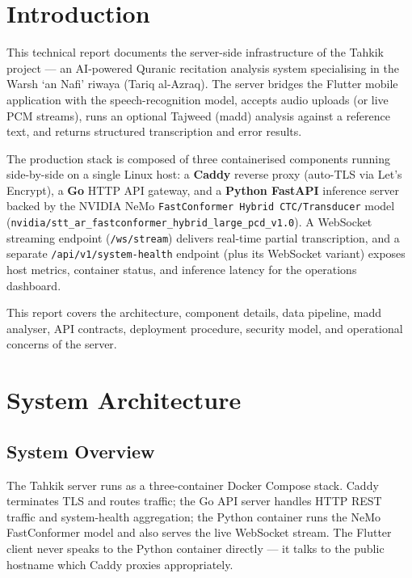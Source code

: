 \chapter{Introduction}

This technical report documents the server-side infrastructure of the Tahkik project --- an AI-powered Quranic recitation analysis system specialising in the Warsh `an Nafi' riwaya (Tariq al-Azraq). The server bridges the Flutter mobile application with the speech-recognition model, accepts audio uploads (or live PCM streams), runs an optional Tajweed (madd) analysis against a reference text, and returns structured transcription and error results.

The production stack is composed of three containerised components running side-by-side on a single Linux host: a \textbf{Caddy} reverse proxy (auto-TLS via Let's Encrypt), a \textbf{Go} HTTP API gateway, and a \textbf{Python FastAPI} inference server backed by the NVIDIA NeMo \texttt{FastConformer Hybrid CTC/Transducer} model (\texttt{nvidia/stt\_ar\_fastconformer\_hybrid\_large\_pcd\_v1.0}). A WebSocket streaming endpoint (\texttt{/ws/stream}) delivers real-time partial transcription, and a separate \texttt{/api/v1/system-health} endpoint (plus its WebSocket variant) exposes host metrics, container status, and inference latency for the operations dashboard.

This report covers the architecture, component details, data pipeline, madd analyser, API contracts, deployment procedure, security model, and operational concerns of the server.

\chapter{System Architecture}

\section{System Overview}

The Tahkik server runs as a three-container Docker Compose stack. Caddy terminates TLS and routes traffic; the Go API server handles HTTP REST traffic and system-health aggregation; the Python container runs the NeMo FastConformer model and also serves the live WebSocket stream. The Flutter client never speaks to the Python container directly --- it talks to the public hostname which Caddy proxies appropriately.

